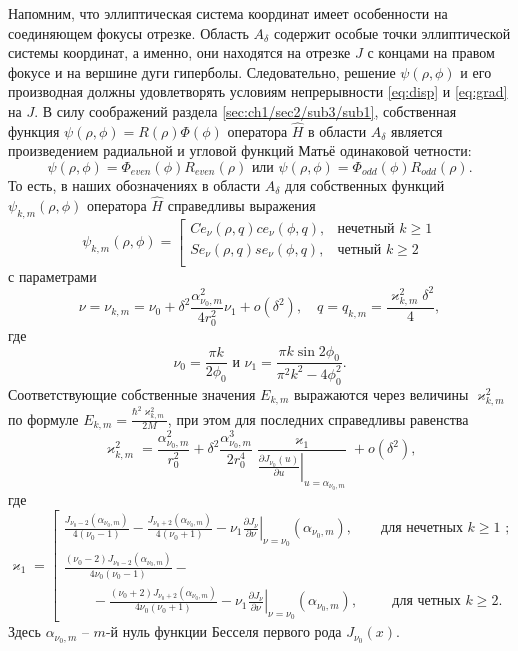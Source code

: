 Напомним, что эллиптическая система координат имеет особенности на соединяющем фокусы отрезке. Область $A_\delta$ содержит особые точки эллиптической системы координат, а именно, они находятся на отрезке $J$ с концами на правом фокусе и на вершине дуги гиперболы.
Следовательно, решение $\psi(\rho, \phi)$ и его производная должны удовлетворять условиям непрерывности \eqref{eq:disp} и \eqref{eq:grad} на  $J$.
В силу соображений раздела \ref{sec:ch1/sec2/sub3/sub1}, собственная функция  $\psi(\rho,\phi)=R(\rho) \Phi(\phi)$ оператора $\hat{H}$ в области $A_\delta$ является произведением радиальной и угловой функций Матьё одинаковой четности:
$$ \psi(\rho,\phi) = \Phi_{even}(\phi) R_{even}(\rho)  
\text{ или }
 \psi(\rho,\phi) = \Phi_{odd}(\phi) R_{odd}(\rho) .  $$
То есть, в наших обозначениях в области $A_\delta$ для собственных функций $\psi_{k, m}(\rho, \phi)$ оператора   $\hat{H}$ справедливы выражения
\begin{equation}
\psi_{k, m}(\rho, \phi) = 
\left[
\begin{array}{ll}
    Ce_\nu(\rho, q) ce_\nu(\phi, q) ,   &    \text{нечетный $k \geq 1$}\\
    Se_\nu(\rho, q) se_\nu(\phi, q) ,   &    \text{четный $k \geq 2$}\\
\end{array}
\right.\label{eq:fun}
\end{equation}
с параметрами
\[
\nu = \nu_{k,m} = \nu_0+ \delta^2 \frac{\alpha_{\nu_0, m}^2}{4 r_0^2}  \nu_1 + o(\delta^2),  \quad q=q_{k,m} = \dfrac{\varkappa_{k,m}^2 \delta^2}{4},
\]
где
$$\nu_0 = \frac{\pi k}{2\phi_0}\text{\ \  и\  \  }\nu_1=\frac{\pi k \sin 2\phi_0}{\pi^2 k^2 - 4\phi_0^2}  .$$
Соответствующие собственные значения $E_{k, m}$ выражаются через величины $\varkappa^2_{k, m}$ по формуле $E_{k, m} =  \frac{\hbar^2 \varkappa^2_{k, m}}{2M}$, при этом для последних  справедливы равенства
\begin{equation}
\varkappa^2_{k, m} = \dfrac{\alpha_{\nu_0, m}^2}{r_0^2} +
\delta^2 \dfrac{\alpha_{\nu_0, m}^3}{2 r_0^4}\dfrac{\varkappa_1 }{ \left.\frac{\partial J_{\nu_0}(u)}{\partial u}\right|_{u=\alpha_{\nu_0, m}} } + o(\delta^2),\label{eq:val}
\end{equation}
где
\begin{equation*}
    \varkappa_1 = 
    \left[
\begin{array}{ll}
\frac{J_{\nu_0-2}(\alpha_{\nu_0, m})}{4(\nu_0-1)} - \frac{J_{\nu_0+2}(\alpha_{\nu_0, m})}{4(\nu_0+1)} 
  - \nu_1 \left.\frac{\partial J_\nu}{\partial \nu}\right|_{\nu=\nu_0}(\alpha_{\nu_0, m}),\qquad \text{для нечетных $k\geq 1$ ;} \\[10pt]
\frac{(\nu_0 - 2)J_{\nu_0-2}(\alpha_{\nu_0, m})   }{4\nu_0 (\nu_0-1)} -\\
\qquad - \frac{(\nu_0 + 2)J_{\nu_0+2}(\alpha_{\nu_0, m})}{4\nu_0 (\nu_0+1)}  
- \nu_1 \left.\frac{\partial J_\nu}{\partial \nu}\right|_{\nu = \nu_0}(\alpha_{\nu_0, m}), \qquad \ \ \!    \text{для четных $k \geq 2$}.        
\end{array}
\right.
\end{equation*}
Здесь $\alpha_{\nu_0,m}$ --  $m$-й нуль функции Бесселя первого рода $J_{\nu_0}(x)$.


